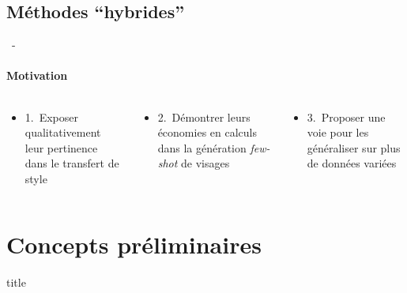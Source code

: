 \documentclass[aspectratio=169, 22pt]{beamer}
\begin{document}
\subsection{Méthodes ``hybrides''}
\begin{frame}{\secname~- \subsecname}
  \framesubtitle{Motivation}
  \begin{columns}
    \begin{column}{0.33\linewidth}
      \begin{itemize}
        \centering
        \item 1. Exposer \alert{qualitativement} leur pertinence dans le transfert de style
      \end{itemize}
    \end{column}
    \begin{column}{0.33\linewidth}
      \begin{itemize}
        \centering
      \item 2. Démontrer leurs \alert{économies en calculs} dans la génération \emph{few-shot} de visages
      \end{itemize}      
    \end{column}
    \begin{column}{0.33\linewidth}
      \begin{itemize}
        \centering
      \item 3. Proposer une voie pour les \alert{généraliser} sur plus de données variées
      \end{itemize}      
    \end{column}
  \end{columns}
\end{frame}


\section{Concepts préliminaires}
\begin{frame}
  \begin{beamercolorbox}[sep=15pt,center,shadow=true,rounded=true]{title}
    \LARGE\bfseries \secname
  \end{beamercolorbox}
\end{frame}
\end{document}
